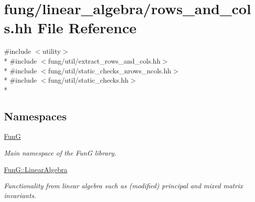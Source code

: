 \hypertarget{rows__and__cols_8hh}{\section{fung/linear\-\_\-algebra/rows\-\_\-and\-\_\-cols.hh File Reference}
\label{rows__and__cols_8hh}
}
{\ttfamily \#include $<$utility$>$}\\*
{\ttfamily \#include $<$fung/util/extract\-\_\-rows\-\_\-and\-\_\-cols.\-hh$>$}\\*
{\ttfamily \#include $<$fung/util/static\-\_\-checks\-\_\-nrows\-\_\-ncols.\-hh$>$}\\*
{\ttfamily \#include $<$fung/util/static\-\_\-checks.\-hh$>$}\\*
\subsection*{Namespaces}
\begin{DoxyCompactItemize}
\item 
\hyperlink{namespaceFunG}{Fun\-G}
\begin{DoxyCompactList}\small\item\em Main namespace of the Fun\-G library. \end{DoxyCompactList}\item 
\hyperlink{namespaceFunG_1_1LinearAlgebra}{Fun\-G\-::\-Linear\-Algebra}
\begin{DoxyCompactList}\small\item\em Functionality from linear algebra such as (modified) principal and mixed matrix invariants. \end{DoxyCompactList}\end{DoxyCompactItemize}
